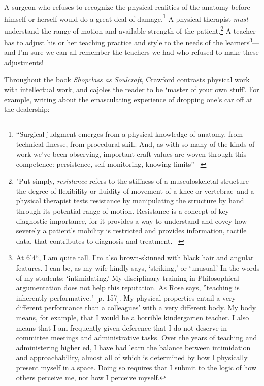 A surgeon who refuses to recognize the physical realities of the anatomy before himself or herself would do a great deal of damage.\footnote{``Surgical judgment emerges from a physical knowledge of anatomy, from technical finesse, from procedural skill. And, as with so many of the kinds of work we've been observing, important craft values are woven through this competence: persistence, self-monitoring, knowing limits'' ~\citep[p. 156]{Rose:2005wi}} A physical therapist \emph{must} understand the range of motion and available strength of the patient.\footnote{"Put simply, \emph{resistance} refers to the stiffness of a musculoskeletal structure---the degree of flexibility or fluidity of movement of a knee or vertebrae--and a physical therapist tests resistance by manipulating the structure by hand through its potential range of motion. Resistance is a concept of key diagnostic importance, for it provides a way to understand and covey how severely a patient's mobility is restricted and provides information, tactile data, that contributes to diagnosis and treatment. ~\citep[p. 152]{Rose:2005wi}} A teacher has to adjust his or her teaching practice and style to the needs of the learners\footnote{At 6'4``, I am quite tall. I'm also brown-skinned with black hair and angular features. I can be, as my wife kindly says, `striking,' or `unusual.' In the words of my students: `intimidating.' My disciplinary training in Philosophical argumentation does not help this reputation. As Rose says, ''teaching is inherently performative." [p. 157]. My physical properties entail a very different performance than a colleagues' with a very different body. My body means, for example, that I would be a horrible kindergarten teacher. I also means that I am frequently given deference that I do not deserve in committee meetings and administrative tasks. Over the years of teaching and administering higher ed, I have had learn the balance between intimidation and approachability, almost all of which is determined by how I physically present myself in a space. Doing so requires that I submit to the logic of how others perceive me, not how I perceive myself.}---and I'm sure we can all remember the teachers we had who refused to make these adjustments!

Throughout the book \emph{Shopclass as Soulcraft}, Crawford contrasts physical work with intellectual work, and cajoles the reader to be `master of your own stuff'. For example, writing about the emasculating experience of dropping one's car off at the dealership:

